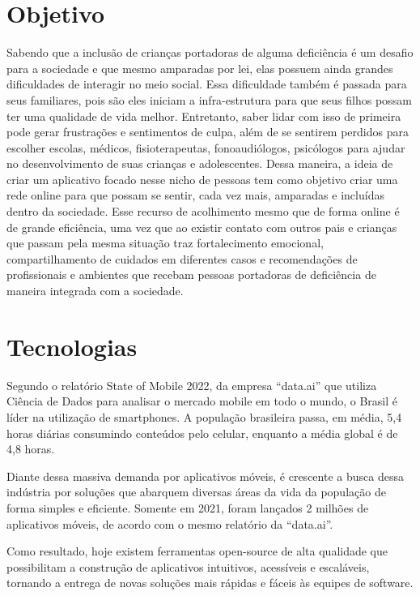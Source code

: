 \begin{apendicesenv}
	\section{Objetivo}
	Sabendo que a inclusão de crianças portadoras de alguma deficiência é um desafio para a sociedade e que mesmo amparadas por lei, elas possuem ainda grandes dificuldades de interagir no meio social. Essa dificuldade também é passada para seus familiares, pois são eles iniciam a infra-estrutura para que seus filhos possam ter uma qualidade de vida melhor. Entretanto, saber lidar com isso de primeira pode gerar frustrações e sentimentos de culpa, além de se sentirem perdidos para escolher escolas, médicos, fisioterapeutas, fonoaudiólogos, psicólogos para ajudar no desenvolvimento de suas crianças e adolescentes.  Dessa maneira, a ideia de criar um aplicativo focado nesse nicho de pessoas tem como objetivo criar uma rede online para que possam se sentir, cada vez mais, amparadas e incluídas dentro da sociedade. Esse recurso de acolhimento mesmo que de forma online é de grande eficiência, uma vez que ao existir contato com outros pais e crianças que passam pela mesma situação traz fortalecimento emocional, compartilhamento de cuidados em diferentes casos e recomendações de profissionais e ambientes que recebam pessoas portadoras de deficiência de maneira integrada com a sociedade.
	
	
	
	\section{Tecnologias}
	Segundo o relatório State of Mobile 2022, da empresa “data.ai” que utiliza Ciência de Dados para analisar o mercado mobile em todo o mundo, o Brasil é líder na utilização de smartphones. A população brasileira passa, em média, 5,4 horas diárias consumindo conteúdos pelo celular, enquanto a média global é de 4,8 horas. 
	
	Diante dessa massiva demanda por aplicativos móveis, é crescente a busca dessa indústria por soluções que abarquem diversas áreas da vida da população de forma simples e eficiente. Somente em 2021, foram lançados 2 milhões de aplicativos móveis, de acordo com o mesmo relatório da “data.ai”.
	
	Como resultado, hoje existem ferramentas open-source de alta qualidade que possibilitam a construção de aplicativos intuitivos, acessíveis e escaláveis, tornando a entrega de novas soluções mais rápidas e fáceis às equipes de software. 
	

\end{apendicesenv}
